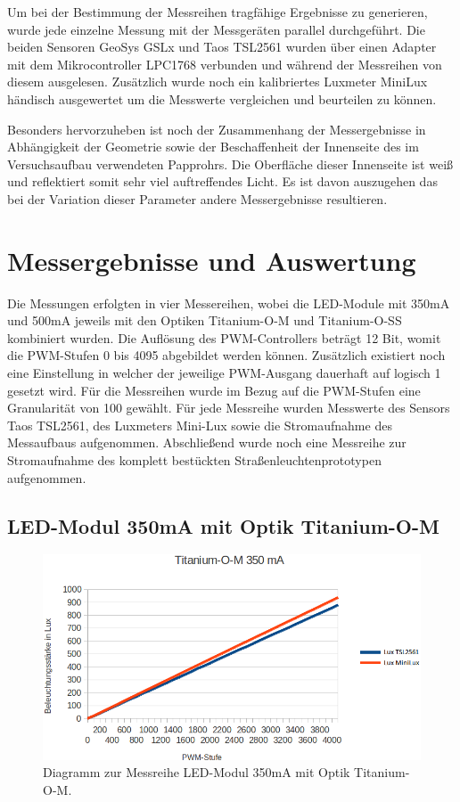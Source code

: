 \documentclass[a4paper,12pt]{scrartcl}
\begin{document}
Um bei der Bestimmung der Messreihen tragfähige Ergebnisse zu generieren, wurde jede einzelne Messung mit der Messgeräten parallel durchgeführt. Die beiden
Sensoren GeoSys GSLx und Taos TSL2561 wurden über einen Adapter mit dem Mikrocontroller LPC1768 verbunden und während der Messreihen von diesem ausgelesen.
Zusätzlich wurde noch ein kalibriertes Luxmeter MiniLux händisch ausgewertet um die Messwerte vergleichen und beurteilen zu können. 

Besonders hervorzuheben ist noch der Zusammenhang der Messergebnisse in Abhängigkeit der Geometrie sowie der Beschaffenheit der Innenseite des im Versuchsaufbau
verwendeten Papprohrs. Die Oberfläche dieser Innenseite ist weiß und reflektiert somit sehr viel auftreffendes Licht. Es ist davon auszugehen das bei der
Variation dieser Parameter andere Messergebnisse resultieren.

\clearpage
\section{Messergebnisse und Auswertung}
\label{sec:auswertung}
Die Messungen erfolgten in vier Messereihen, wobei die LED-Module mit 350mA und 500mA jeweils mit den Optiken Titanium-O-M und Titanium-O-SS kombiniert wurden.
Die Auflösung des PWM-Controllers beträgt 12 Bit, womit die PWM-Stufen 0 bis 4095 abgebildet werden können. Zusätzlich existiert noch eine Einstellung in
welcher der jeweilige PWM-Ausgang dauerhaft auf logisch 1 gesetzt wird. Für die Messreihen wurde im Bezug auf die PWM-Stufen eine Granularität von 100 gewählt.
Für jede Messreihe wurden Messwerte  des Sensors Taos TSL2561, des Luxmeters Mini-Lux sowie die Stromaufnahme des Messaufbaus aufgenommen.
Abschließend wurde noch eine Messreihe zur Stromaufnahme des komplett bestückten Straßenleuchtenprototypen aufgenommen.

\subsection{LED-Modul 350mA mit Optik Titanium-O-M}

\begin{figure}[H]
  \begin{center}
    \includegraphics[width=1\hsize]{./images/350-m-print.png}
  \end{center}
\caption[Diagramm zur Messreihe LED-Modul 350mA mit Optik Titanium-O-M]{\label{diagram350matitm}Diagramm zur Messreihe LED-Modul 350mA mit Optik
Titanium-O-M.}
\end{figure}
\end{document}
